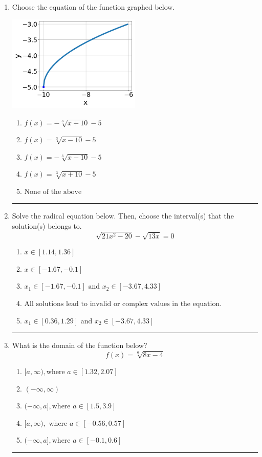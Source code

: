 \documentclass[14pt]{extbook}
\newcommand{\litem}[1]{\item#1\hspace*{-1cm}\rule{\textwidth}{0.4pt}}
\begin{document}
\begin{enumerate}
{\begin{enumerate}[label=\Alph*.]
\end{enumerate} }
\litem{
Choose the equation of the function graphed below.
\begin{center}
    \includegraphics[width=0.5\textwidth]{../Figures/radicalGraphToEquationCopyB.png}
\end{center}
\begin{enumerate}[label=\Alph*.]
\item \( f(x) = - \sqrt[3]{x + 10} - 5 \)
\item \( f(x) = \sqrt[3]{x - 10} - 5 \)
\item \( f(x) = - \sqrt[3]{x - 10} - 5 \)
\item \( f(x) = \sqrt[3]{x + 10} - 5 \)
\item \( \text{None of the above} \)

\end{enumerate} }
\litem{
Solve the radical equation below. Then, choose the interval(s) that the solution(s) belongs to.\[ \sqrt{21 x^2 - 20} - \sqrt{13 x} = 0 \]\begin{enumerate}[label=\Alph*.]
\item \( x \in [1.14,1.36] \)
\item \( x \in [-1.67,-0.1] \)
\item \( x_1 \in [-1.67, -0.1] \text{ and } x_2 \in [-3.67,4.33] \)
\item \( \text{All solutions lead to invalid or complex values in the equation.} \)
\item \( x_1 \in [0.36, 1.29] \text{ and } x_2 \in [-3.67,4.33] \)

\end{enumerate} }
\litem{
What is the domain of the function below?\[ f(x) = \sqrt[6]{8 x - 4} \]\begin{enumerate}[label=\Alph*.]
\item \( [a, \infty), \text{where } a \in [1.32, 2.07] \)
\item \( (-\infty, \infty) \)
\item \( (-\infty, a], \text{where } a \in [1.5, 3.9] \)
\item \( [a, \infty), \text{ where } a \in [-0.56, 0.57] \)
\item \( (-\infty, a], \text{where } a \in [-0.1, 0.6] \)


\end{enumerate}}
\end{enumerate}
\end{document}
